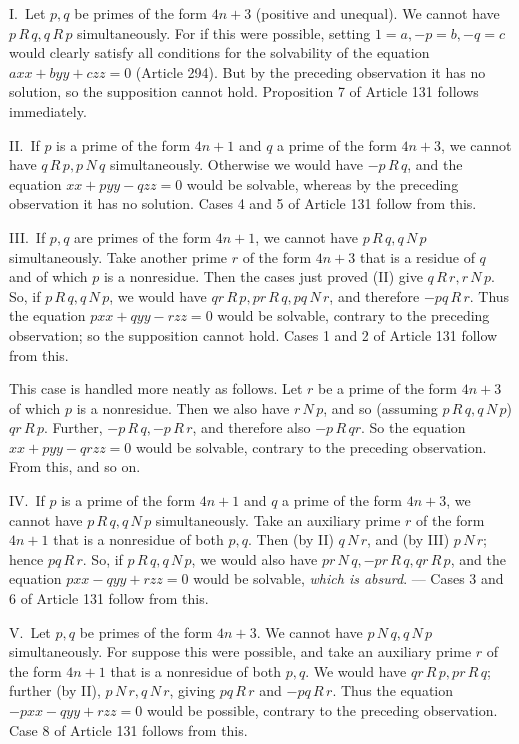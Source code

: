 I.\ Let \(p,q\) be primes of the form \(4n+3\) (positive and unequal).
We cannot have \(p\,R\,q,q\,R\,p\) simultaneously. For if this were possible,
setting \(1=a,-p=b,-q=c\) would clearly satisfy all conditions for the
solvability of the equation \(axx+byy+czz=0\) (Article 294). But by the preceding
observation it has no solution, so the supposition cannot hold.
Proposition 7 of Article 131 follows immediately.

II.\ If \(p\) is a prime of the form \(4n+1\) and \(q\) a prime
of the form \(4n+3\), we cannot have \(q\,R\,p,p\,N\,q\) simultaneously. Otherwise
we would have \(-p\,R\,q\), and the equation \(xx+pyy-qzz=0\) would be solvable,
whereas by the preceding observation it has no solution. Cases 4
and 5 of Article 131 follow from this.

III.\ If \(p,q\) are primes of the form \(4n+1\), we cannot have
\(p\,R\,q,q\,N\,p\) simultaneously. Take another prime \(r\) of the form
\(4n+3\) that is a residue of \(q\) and of which \(p\) is a
nonresidue. Then the cases just proved (II) give \(q\,R\,r,r\,N\,p\). So, if
\(p\,R\,q,q\,N\,p\), we would have \(qr\,R\,p,pr\,R\,q,pq\,N\,r\), and therefore \(-pq\,R\,r\). Thus the
equation \(pxx+qyy-rzz=0\) would be solvable, contrary to the preceding
observation; so the supposition cannot hold. Cases 1 and 2 of
Article 131 follow from this.

This case is handled more neatly as follows. Let \(r\) be a
prime of the form \(4n+3\) of which \(p\) is a nonresidue. Then
we also have \(r\,N\,p\), and so (assuming \(p\,R\,q,q\,N\,p\)) \(qr\,R\,p\). Further,
\(-p\,R\,q,-p\,R\,r\), and therefore also \(-p\,R\,qr\). So the equation \(xx+pyy-qrzz=0\)
would be solvable, contrary to the preceding observation. From
this, and so on.

IV.\ If \(p\) is a prime of the form \(4n+1\) and \(q\) a prime
of the form \(4n+3\),
we cannot have \(p\,R\,q,q\,N\,p\) simultaneously. Take an auxiliary prime
\(r\) of the form \(4n+1\) that is a nonresidue of both \(p,q\).
Then (by II) \(q\,N\,r\), and (by III) \(p\,N\,r\); hence \(pq\,R\,r\). So,
if \(p\,R\,q,q\,N\,p\), we would also have \(pr\,N\,q,-pr\,R\,q,qr\,R\,p\), and the equation \(pxx-qyy+rzz=0\)
would be solvable, \emph{which is absurd}. --- Cases 3 and 6 of
Article 131 follow from this.

V.\ Let \(p,q\) be primes of the form \(4n+3\). We cannot have
\(p\,N\,q,q\,N\,p\) simultaneously. For suppose this were possible, and take
an auxiliary prime \(r\) of the form \(4n+1\) that is a nonresidue
of both \(p,q\). We would have \(qr\,R\,p,pr\,R\,q\); further (by II), \(p\,N\,r,q\,N\,r\),
giving \(pq\,R\,r\) and \(-pq\,R\,r\). Thus the equation \(-pxx-qyy+rzz=0\) would be
possible, contrary to the preceding observation. Case 8 of Article
131 follows from this.

